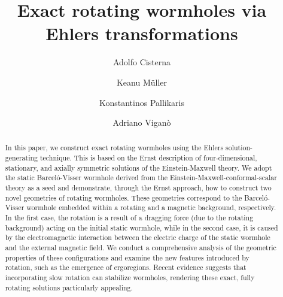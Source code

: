 \documentclass[aps,preprint,groupedaddress,nofootinbib,superscriptaddress,showkeys,showpacs,eqsecnum,amsmath,amssymb]{revtex4-1}
\begin{document}
\title{Exact rotating wormholes via Ehlers transformations} 

\author{Adolfo Cisterna}

\author{Keanu Müller}

\author{Konstantinos Pallikaris}

\author{Adriano Viganò}

\begin{abstract}

In this paper, we construct exact rotating wormholes using the Ehlers solution-generating technique. This is based on the Ernst description of four-dimensional, stationary, and axially symmetric solutions of the Einstein-Maxwell theory. We adopt the static Barcel\'o-Visser wormhole derived from the Einstein-Maxwell-conformal-scalar theory as a seed and demonstrate, through the Ernst approach, how to construct two novel geometries of rotating wormholes. These geometries correspond to the Barcel\'o-Visser wormhole embedded within a rotating and a magnetic background, respectively. In the first case, the rotation is a result of a dragging force (due to the rotating background) acting on the initial static wormhole, while in the second case, it is caused by the electromagnetic interaction between the electric charge of the static wormhole and the external magnetic field. We conduct a comprehensive analysis of the geometric properties of these configurations and examine the new features introduced by rotation, such as the emergence of ergoregions. Recent evidence suggests that incorporating slow rotation can stabilize wormholes, rendering these exact, fully rotating solutions particularly appealing. %
\end{abstract}

\end{document}
